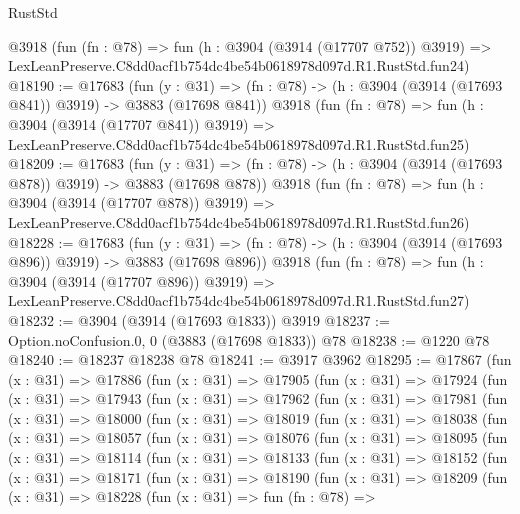 \begin{lexlean}{RustStd}
\begin{coremodule}
    @3918
    (fun (fn : @78) =>
    fun (h : @3904 (@3914 (@17707 @752)) @3919) =>
    LexLeanPreserve.C8dd0acf1b754dc4be54b0618978d097d.R1.RustStd.fun24)
@18190 := @17683
    (fun (y : @31) => (fn : @78) -> (h : @3904 (@3914 (@17693 @841)) @3919) -> @3883 (@17698 @841))
    @3918
    (fun (fn : @78) =>
    fun (h : @3904 (@3914 (@17707 @841)) @3919) =>
    LexLeanPreserve.C8dd0acf1b754dc4be54b0618978d097d.R1.RustStd.fun25)
@18209 := @17683
    (fun (y : @31) => (fn : @78) -> (h : @3904 (@3914 (@17693 @878)) @3919) -> @3883 (@17698 @878))
    @3918
    (fun (fn : @78) =>
    fun (h : @3904 (@3914 (@17707 @878)) @3919) =>
    LexLeanPreserve.C8dd0acf1b754dc4be54b0618978d097d.R1.RustStd.fun26)
@18228 := @17683
    (fun (y : @31) => (fn : @78) -> (h : @3904 (@3914 (@17693 @896)) @3919) -> @3883 (@17698 @896))
    @3918
    (fun (fn : @78) =>
    fun (h : @3904 (@3914 (@17707 @896)) @3919) =>
    LexLeanPreserve.C8dd0acf1b754dc4be54b0618978d097d.R1.RustStd.fun27)
@18232 := @3904 (@3914 (@17693 @1833)) @3919
@18237 := Option.noConfusion.{0, 0} (@3883 (@17698 @1833)) @78
@18238 := @1220 @78
@18240 := @18237 @18238 @78
@18241 := @3917 @3962
@18295 := @17867
    (fun (x : @31) =>
    @17886
      (fun (x : @31) =>
      @17905
        (fun (x : @31) =>
        @17924
          (fun (x : @31) =>
          @17943
            (fun (x : @31) =>
            @17962
              (fun (x : @31) =>
              @17981
                (fun (x : @31) =>
                @18000
                  (fun (x : @31) =>
                  @18019
                    (fun (x : @31) =>
                    @18038
                      (fun (x : @31) =>
                      @18057
                        (fun (x : @31) =>
                        @18076
                          (fun (x : @31) =>
                          @18095
                            (fun (x : @31) =>
                            @18114
                              (fun (x : @31) =>
                              @18133
                                (fun (x : @31) =>
                                @18152
                                  (fun (x : @31) =>
                                  @18171
                                    (fun (x : @31) =>
                                    @18190
                                      (fun (x : @31) =>
                                      @18209
                                        (fun (x : @31) =>
                                        @18228
                                          (fun (x : @31) =>
                                          fun (fn : @78) =>

\end{coremodule}
\end{lexlean}
